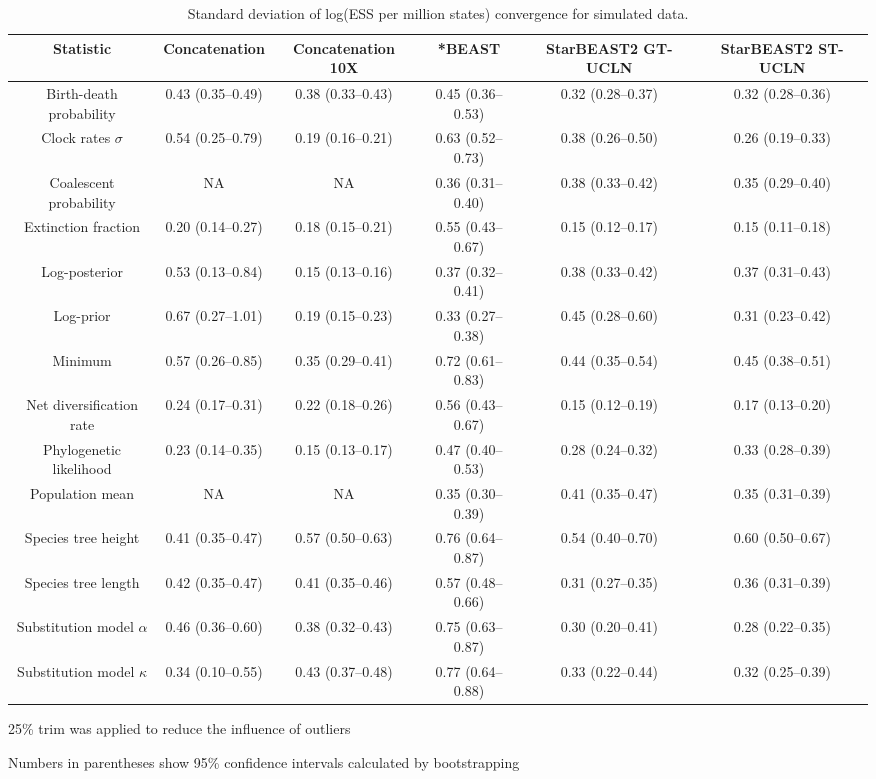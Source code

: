 \documentclass[12pt]{article}
\begin{document}
\begin{landscape}
\clearpage

\begin{table}[htb!]
\centering
\caption{Standard deviation of log(ESS per million states) convergence for simulated data.}
\label{tab:simulatedPerMstatesSD}
\begin{threeparttable}
\begin{adjustbox}{center}
\renewcommand{\arraystretch}{1.2}
\footnotesize
\begin{tabular}{|c|c|c|c|c|c|}
\multicolumn{1}{c}{Statistic} & \multicolumn{1}{c}{Concatenation} & \multicolumn{1}{c}{Concatenation 10X} & \multicolumn{1}{c}{*BEAST} & \multicolumn{1}{c}{StarBEAST2 GT-UCLN} & \multicolumn{1}{c}{StarBEAST2 ST-UCLN}\tabularnewline
\hline
Birth-death probability & 0.43 (0.35--0.49) & 0.38 (0.33--0.43) & 0.45 (0.36--0.53) & 0.32 (0.28--0.37) & 0.32 (0.28--0.36)\tabularnewline
\hline
Clock rates $\sigma$ & 0.54 (0.25--0.79) & 0.19 (0.16--0.21) & 0.63 (0.52--0.73) & 0.38 (0.26--0.50) & 0.26 (0.19--0.33)\tabularnewline
\hline
Coalescent probability & NA & NA & 0.36 (0.31--0.40) & 0.38 (0.33--0.42) & 0.35 (0.29--0.40)\tabularnewline
\hline
Extinction fraction & 0.20 (0.14--0.27) & 0.18 (0.15--0.21) & 0.55 (0.43--0.67) & 0.15 (0.12--0.17) & 0.15 (0.11--0.18)\tabularnewline
\hline
Log-posterior & 0.53 (0.13--0.84) & 0.15 (0.13--0.16) & 0.37 (0.32--0.41) & 0.38 (0.33--0.42) & 0.37 (0.31--0.43)\tabularnewline
\hline
Log-prior & 0.67 (0.27--1.01) & 0.19 (0.15--0.23) & 0.33 (0.27--0.38) & 0.45 (0.28--0.60) & 0.31 (0.23--0.42)\tabularnewline
\hline
Minimum & 0.57 (0.26--0.85) & 0.35 (0.29--0.41) & 0.72 (0.61--0.83) & 0.44 (0.35--0.54) & 0.45 (0.38--0.51)\tabularnewline
\hline
Net diversification rate & 0.24 (0.17--0.31) & 0.22 (0.18--0.26) & 0.56 (0.43--0.67) & 0.15 (0.12--0.19) & 0.17 (0.13--0.20)\tabularnewline
\hline
Phylogenetic likelihood & 0.23 (0.14--0.35) & 0.15 (0.13--0.17) & 0.47 (0.40--0.53) & 0.28 (0.24--0.32) & 0.33 (0.28--0.39)\tabularnewline
\hline
Population mean & NA & NA & 0.35 (0.30--0.39) & 0.41 (0.35--0.47) & 0.35 (0.31--0.39)\tabularnewline
\hline
Species tree height & 0.41 (0.35--0.47) & 0.57 (0.50--0.63) & 0.76 (0.64--0.87) & 0.54 (0.40--0.70) & 0.60 (0.50--0.67)\tabularnewline
\hline
Species tree length & 0.42 (0.35--0.47) & 0.41 (0.35--0.46) & 0.57 (0.48--0.66) & 0.31 (0.27--0.35) & 0.36 (0.31--0.39)\tabularnewline
\hline
Substitution model $\alpha$ & 0.46 (0.36--0.60) & 0.38 (0.32--0.43) & 0.75 (0.63--0.87) & 0.30 (0.20--0.41) & 0.28 (0.22--0.35)\tabularnewline
\hline
Substitution model $\kappa$ & 0.34 (0.10--0.55) & 0.43 (0.37--0.48) & 0.77 (0.64--0.88) & 0.33 (0.22--0.44) & 0.32 (0.25--0.39)\tabularnewline
\hline
\end{tabular}
\end{adjustbox}
\begin{tablenotes}
\footnotesize
\item 25\% trim was applied to reduce the influence of outliers
\item Numbers in parentheses show 95\% confidence intervals calculated by bootstrapping
\end{tablenotes}
\end{threeparttable}
\end{table}

\end{landscape}
\end{document}
